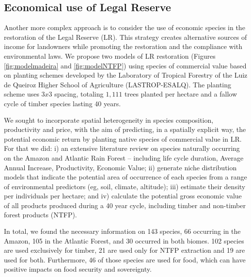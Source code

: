 \subsection{\large Economical use of Legal Reserve} \label{subsec:socio-use}

Another more complex approach is to consider the use of economic species in the restoration of the Legal Reserve (LR). This strategy creates alternative sources of income for landowners while promoting the restoration and the compliance with environmental laws. We propose two models of LR restoration (Figures \ref{fig:modelmadeira} and \ref{fig:modelNTFP}) using species of commercial value based on planting schemes developed by the Laboratory of Tropical Forestry of the Luiz de Queiroz Higher School of Agriculture (LASTROP-ESALQ). The planting scheme uses $3x3$ spacing, totaling $1,111$ trees planted per hectare and a fallow cycle of timber species lasting 40 years.

We sought to incorporate spatial heterogeneity in species composition, productivity and price, with the aim of predicting, in a spatially explicit way, the potential economic return by planting native species of commercial value in LR. For that we did: i) an extensive literature review on species naturally occurring on the Amazon and Atlantic Rain Forest – including life cycle duration, Average Annual Increase, Productivity, Economic Value; ii) generate niche distribution models that indicate the potential area of occurrence of each species from a range of environmental predictors (eg, soil, climate, altitude); iii) estimate their density per individuals per hectare; and iv) calculate the potential gross economic value of all products produced during a 40 year cycle, including timber and non-timber forest products (NTFP).

In total, we found the necessary information on 143 species, 66 occurring in the Amazon, 105 in the Atlantic Forest, and 30 occurred in both biomes. 102 species are used exclusively for timber, 21 are used only for NTFP extraction and 19 are used for both. Furthermore, 46 of those species are used for food, which can have positive impacts on food security and sovereignty. 

